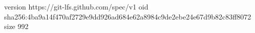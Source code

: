 version https://git-lfs.github.com/spec/v1
oid sha256:4ba9a14f470af2729e9dd926ad684e62a8984c9de2ebe24e67d9b82c83ff8072
size 992
